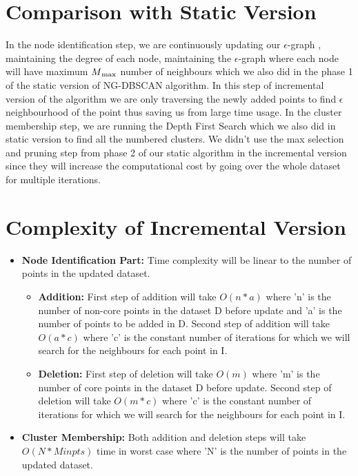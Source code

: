 \documentclass[acmsmall]{acmart}
\begin{document}
\section*{Comparison with Static Version}
In the node identification step, we are continuously updating our $\epsilon$-graph , maintaining the degree of each node, maintaining the $\epsilon$-graph where each node will have maximum $M\textsubscript{max}$ number of neighbours which we also did in the phase 1 of the static version of NG-DBSCAN algorithm. In this step of incremental version of the algorithm we are only traversing the newly added points to find $\epsilon$ neighbourhood of the point thus saving us from large time usage. \newline
In the cluster membership step, we are running the Depth First Search which we also did in static version to find all the numbered clusters. \newline 
We didn't use the max selection and pruning step from phase 2 of our static algorithm in the incremental version since they will increase the computational cost by going over the whole dataset for multiple iterations.  

\section*{Complexity of Incremental Version}
\begin{itemize}
    \item \textbf{Node Identification Part: } Time complexity will be linear to the number of points in the updated dataset.
    \vspace{3pt}
    \begin{itemize}
        \item \textbf{Addition: }First step of addition will take $O(n*a)$ where 'n' is the number of non-core points in the dataset D before update and 'a' is the number of points to be added in D. Second step of addition will take $O(a*c)$ where 'c' is the constant number of iterations for which we will search for the neighbours for each point in I. 
        \vspace{3pt}
        \item \textbf{Deletion: }First step of deletion will take $O(m)$ where 'm' is the number of core points in the dataset D before update. Second step of deletion will take $O(m*c)$ where 'c' is the constant number of iterations for which we will search for the neighbours for each point in I. 
    \end{itemize}
    \vspace{4pt}
    \item \textbf{Cluster Membership: }Both addition and deletion steps will take $O(N*Minpts)$ time in worst case where 'N' is the number of points in the updated dataset.
\end{itemize}
\end{document}
